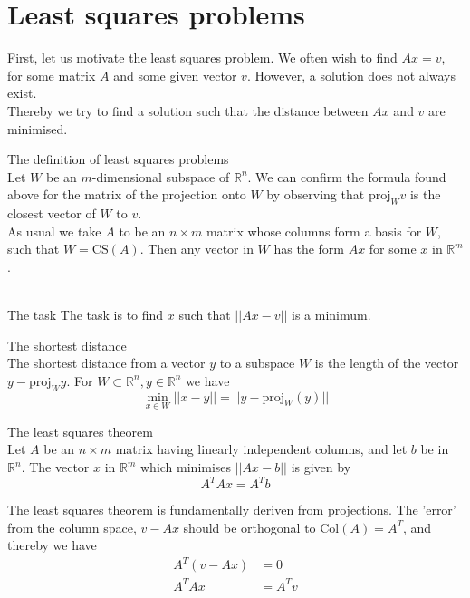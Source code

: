 \documentclass[journal, letterpaper]{IEEEtran}
\begin{document}
    \section{Least squares problems}
    First, let us motivate the least squares problem. We often wish to find $Ax = v$, for some matrix $A$ and some given vector $v$. However, a solution does not always exist.
    \newline \\
    Thereby we try to find a solution such that the distance between $Ax$ and $v$ are minimised.
    \begin{mybox}{The definition of least squares problems} \\ 
        Let $W$ be an $m$-dimensional subspace of $\mathbb{R}^n$. We can confirm the formula found above for the matrix of the projection onto $W$ by observing that $\text{proj}_{W}v$ is the closest vector of $W$ to $v$.
        \newline \\ 
        As usual we take $A$ to be an $n \times m$ matrix whose columns form a basis for $W$, such that $W = \text{CS}(A)$. Then any vector in $W$ has the form $Ax$ for some $x$ in $\mathbb{R}^m$. \\ \\
        \begin{myboxr}{The task}
            The task is to find $x$ such that $||Ax - v||$ is a minimum.
        \end{myboxr}
    \end{mybox}
    \begin{myboxg}{The shortest distance} \\ 
        The shortest distance from a vector $y$ to a subspace $W$ is the length of the vector $y - \text{proj}_W{y}$. For $W \subset \mathbb{R}^n, y \in \mathbb{R}^n$ we have
        $$ \min_{x\in W}||x - y|| = ||y - \text{proj}_{W}(y)||$$
    \end{myboxg}
    \begin{myboxr}{The least squares theorem} \\
        Let $A$ be an $n\times m$ matrix having linearly independent columns, and let $b$ be in $\mathbb{R}^n$. The vector $x$ in $\mathbb{R}^m$ which minimises $||Ax - b||$ is given by
        $$ A^TAx = A^Tb$$
    \end{myboxr}
    The least squares theorem is fundamentally deriven from projections. The 'error' from the column space, $v - Ax$ should be orthogonal to $\text{Col}(A) = A^T$, and thereby we have
    \begin{align*}A^T(v - Ax) &= 0 \\ A^TAx &= A^Tv\end{align*}
\end{document}
